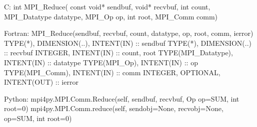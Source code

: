 C:
int MPI_Reduce(
    const void* sendbuf, void* recvbuf, int count, MPI_Datatype datatype,
    MPI_Op op, int root, MPI_Comm comm)

Fortran:
MPI_Reduce(sendbuf, recvbuf, count, datatype, op, root, comm, ierror)
TYPE(*), DIMENSION(..), INTENT(IN) :: sendbuf
TYPE(*), DIMENSION(..) :: recvbuf
INTEGER, INTENT(IN) :: count, root
TYPE(MPI_Datatype), INTENT(IN) :: datatype
TYPE(MPI_Op), INTENT(IN) :: op
TYPE(MPI_Comm), INTENT(IN) :: comm
INTEGER, OPTIONAL, INTENT(OUT) :: ierror

Python:
mpi4py.MPI.Comm.Reduce(self, sendbuf, recvbuf, Op op=SUM, int root=0)
mpi4py.MPI.Comm.reduce(self, sendobj=None, recvobj=None, op=SUM, int root=0)
